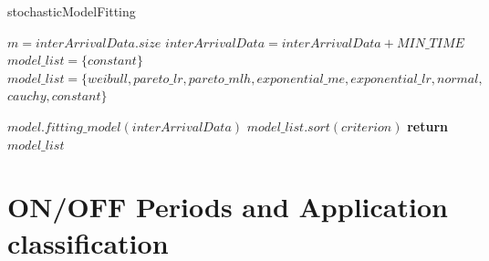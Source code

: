 \begin{algorithm}[ht!]
    \caption{stochasticModelFitting}
    \label{alg:stochasticModelFitting}
    \begin{algorithmic}[1]
        \small        {}
        \State $m = interArrivalData.size$
        \State $interArrivalData = interArrivalData + MIN\_TIME$
        \State $model\_list = \{constant\}$
        \Else
        \State $model\_list = \{weibull, pareto\_lr, pareto\_mlh, exponential\_me, exponential\_lr, normal,$
        \State $cauchy, constant\}$
        \EndIf
        
        \State $model.fitting\_model(interArrivalData)$
        \EndFor
        \State $model\_list.sort(criterion)$
        \State \textbf{return} $model\_list$
        \EndFunction
    \end{algorithmic}
\end{algorithm}

\section{ON/OFF Periods and Application classification}

